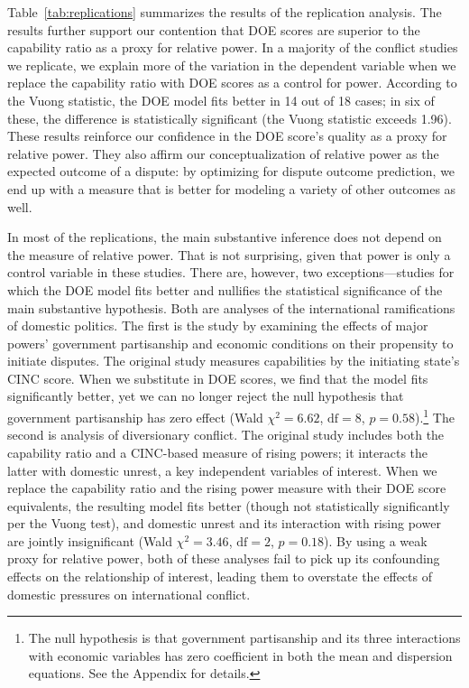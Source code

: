 Table~\ref{tab:replications} summarizes the results of the replication analysis.
The results further support our contention that DOE scores are superior to the capability ratio as a proxy for relative power.
In a majority of the conflict studies we replicate, we explain more of the variation in the dependent variable when we replace the capability ratio with DOE scores as a control for power.
According to the Vuong statistic, the DOE model fits better in 14 out of 18 cases; in six of these, the difference is statistically significant (the Vuong statistic exceeds 1.96).
These results reinforce our confidence in the DOE score's quality as a proxy for relative power.
They also affirm our conceptualization of relative power as the expected outcome of a dispute: by optimizing for dispute outcome prediction, we end up with a measure that is better for modeling a variety of other outcomes as well.

In most of the replications, the main substantive inference does not depend on the measure of relative power.
That is not surprising, given that power is only a control variable in these studies.
There are, however, two exceptions---studies for which the DOE model fits better and nullifies the statistical significance of the main substantive hypothesis.
Both are analyses of the international ramifications of domestic politics.
The first is the study by \citet{Arena:2009gk} examining the effects of major powers' government partisanship and economic conditions on their propensity to initiate disputes.
The original study measures capabilities by the initiating state's CINC score.
When we substitute in DOE scores, we find that the model fits significantly better, yet we can no longer reject the null hypothesis that government partisanship has zero effect (Wald $\chi^2 = 6.62$, $\text{df} = 8$, $p = 0.58$).\footnote{%
  The null hypothesis is that government partisanship and its three interactions with economic variables has zero coefficient in both the mean and dispersion equations.
  See the Appendix for details.
}
The second is  analysis of diversionary conflict.
The original study includes both the capability ratio and a CINC-based measure of rising powers; it interacts the latter with domestic unrest, a key independent variables of interest.
When we replace the capability ratio and the rising power measure with their DOE score equivalents, the resulting model fits better (though not statistically significantly per the Vuong test), and domestic unrest and its interaction with rising power are jointly insignificant (Wald $\chi^2 = 3.46$, $\text{df} = 2$, $p = 0.18$).
By using a weak proxy for relative power, both of these analyses fail to pick up its confounding effects on the relationship of interest, leading them to overstate the effects of domestic pressures on international conflict.

